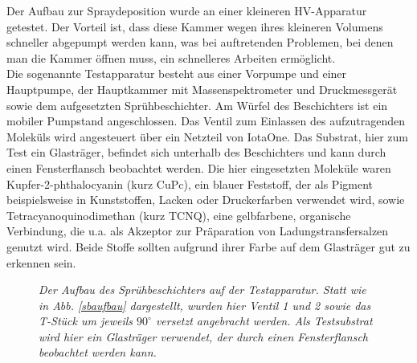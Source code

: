Der Aufbau zur Spraydeposition wurde an einer kleineren HV-Apparatur getestet. %
Der
Vorteil ist, dass diese Kammer wegen ihres kleineren Volumens schneller abgepumpt werden kann, was bei
auftretenden Problemen, bei denen man die Kammer öffnen muss, ein schnelleres Arbeiten ermöglicht.\\
Die sogenannte Testapparatur besteht aus einer Vorpumpe und  einer Hauptpumpe,
der Hauptkammer mit Massenspektrometer und Druckmessgerät sowie dem aufgesetzten
Sprühbeschichter. Am Würfel des Beschichters ist ein mobiler Pumpstand angeschlossen. Das Ventil
zum Einlassen des aufzutragenden Moleküls wird angesteuert über ein Netzteil von IotaOne. Das
Substrat, hier zum Test ein Glasträger, befindet sich unterhalb des Beschichters und kann durch einen
Fensterflansch beobachtet werden. Die hier eingesetzten Moleküle waren Kupfer-2-phthalocyanin (kurz
CuPc), ein blauer Feststoff, der als Pigment
beispielsweise in Kunststoffen, Lacken oder
Druckerfarben verwendet wird, sowie 
Tetracyanoquinodimethan (kurz TCNQ), eine gelbfarbene,
organische Verbindung, die u.a. als Akzeptor zur Präparation von Ladungstransfersalzen genutzt wird.
Beide Stoffe sollten aufgrund ihrer Farbe auf dem Glasträger gut zu erkennen sein.

 
\begin{figure}[H]
	\centering
	\sffamily
	
	\caption{\textit{Der Aufbau des Sprühbeschichters auf der Testapparatur. Statt wie in Abb.
	\ref{sbaufbau} dargestellt, wurden hier Ventil 1 und 2 sowie das T-Stück um jeweils $90^{\circ}$
	versetzt angebracht werden. Als Testsubstrat wird hier ein Glasträger verwendet, der durch einen
	Fensterflansch beobachtet werden kann. }}
\label{aufbau}
\end{figure}
 
 

